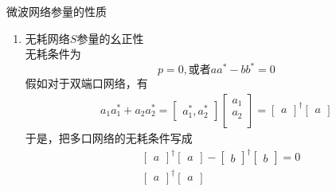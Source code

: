 \begin{frame}{微波网络参量的性质}
    \begin{enumerate}
        \resume
        \item 无耗网络$S$参量的幺正性\\
              无耗条件为
              $$p=0,或者aa^*-bb^*=0$$
              假如对于双端口网络，有
              \begin{align*}
                  a_1a_1^*+a_2a_2^*=
                  \begin{bmatrix*}
                      a_1^*,a_2^*
                  \end{bmatrix*}
                  \begin{bmatrix*}
                      a_1 \\
                      a_2 \\
                  \end{bmatrix*}
                  =
                  \begin{bmatrix*}
                      a
                  \end{bmatrix*}^\dagger
                  \begin{bmatrix*}
                      a
                  \end{bmatrix*}
              \end{align*}
              于是，把多口网络的无耗条件写成
              \begin{align*}
                   & \begin{bmatrix*}
                         a
                     \end{bmatrix*}^\dagger
                  \begin{bmatrix*}
                      a
                  \end{bmatrix*}
                  -
                  \begin{bmatrix*}
                      b
                  \end{bmatrix*}^\dagger
                  \begin{bmatrix*}
                      b
                  \end{bmatrix*}
                  =0                        \\
                   & \begin{bmatrix*}
                         a
                     \end{bmatrix*}^\dagger
                  \begin{bmatrix*}
                      a

\end{bmatrix*}
\end{align*}
\end{enumerate}
\end{frame}
